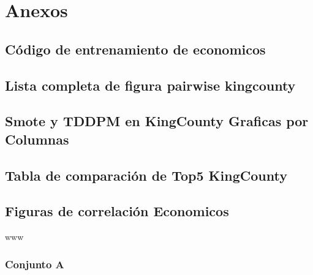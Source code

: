\chapter{Anexos}

\section{Código de entrenamiento de economicos}



\section{Lista completa de figura pairwise kingcounty}
\label{A-pairwise-kingcounty-top2-a-1}



\section{Smote y TDDPM en KingCounty Graficas por Columnas}

%

\section{Tabla de comparación de Top5 KingCounty}

\section{Figuras de correlación Economicos}


www
\subsection{Conjunto A}
%

